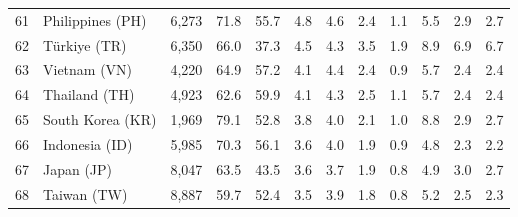 \documentclass[10pt,a4paper,twocolumn]{article}
\begin{document}
\begin{tabular}{@{}rlrrrrrrrrrr@{}}
61 & Philippines (PH) & 6,273 & 71.8 & 55.7 & 4.8 & 4.6 & 2.4 & 1.1 & 5.5 & 2.9 & 2.7 \\
62 & Türkiye (TR) & 6,350 & 66.0 & 37.3 & 4.5 & 4.3 & 3.5 & 1.9 & 8.9 & 6.9 & 6.7 \\
63 & Vietnam (VN) & 4,220 & 64.9 & 57.2 & 4.1 & 4.4 & 2.4 & 0.9 & 5.7 & 2.4 & 2.4 \\
64 & Thailand (TH) & 4,923 & 62.6 & 59.9 & 4.1 & 4.3 & 2.5 & 1.1 & 5.7 & 2.4 & 2.4 \\
65 & South Korea (KR) & 1,969 & 79.1 & 52.8 & 3.8 & 4.0 & 2.1 & 1.0 & 8.8 & 2.9 & 2.7 \\
66 & Indonesia (ID) & 5,985 & 70.3 & 56.1 & 3.6 & 4.0 & 1.9 & 0.9 & 4.8 & 2.3 & 2.2 \\
67 & Japan (JP) & 8,047 & 63.5 & 43.5 & 3.6 & 3.7 & 1.9 & 0.8 & 4.9 & 3.0 & 2.7 \\
68 & Taiwan (TW) & 8,887 & 59.7 & 52.4 & 3.5 & 3.9 & 1.8 & 0.8 & 5.2 & 2.5 & 2.3 \\
\bottomrule
\end{tabular}
\end{document}
